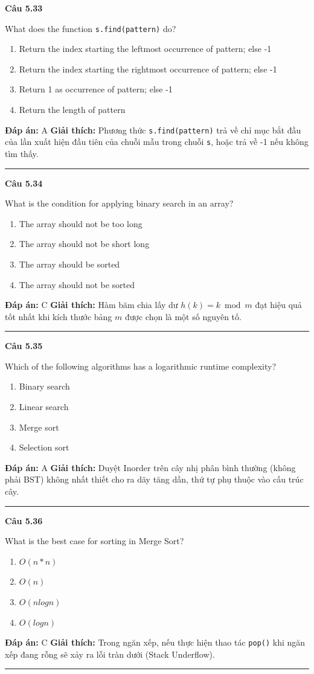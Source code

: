\documentclass[11pt,a4paper]{article}
\newenvironment{question}[1]{%
  \par\vspace{1em}\noindent\textbf{\large Câu #1}\par\vspace{0.4em}
}{%
  \par\vspace{1em}\hrule\vspace{0.6em}
}
\newenvironment{choices}{%
  \begin{enumerate}[label=\textbf{\Alph*.},leftmargin=2.2em,itemsep=2pt,topsep=3pt]
}{%
  \end{enumerate}
}
\newcommand{\choice}{\item}
\begin{document}
\begin{question}{5.33}
What does the function \texttt{s.find(pattern)} do?
\begin{choices}
\choice Return the index starting the leftmost occurrence of pattern; else -1
\choice Return the index starting the rightmost occurrence of pattern; else -1
\choice Return 1 as occurrence of pattern; else -1
\choice Return the length of pattern
\end{choices}
\textbf{Đáp án:} A
\textbf{Giải thích:} Phương thức \texttt{s.find(pattern)} trả về chỉ mục bắt đầu của lần xuất hiện đầu tiên của chuỗi mẫu trong chuỗi \texttt{s}, hoặc trả về -1 nếu không tìm thấy.
\end{question}

\begin{question}{5.34}
What is the condition for applying binary search in an array?
\begin{choices}
\choice The array should not be too long
\choice The array should not be short long
\choice The array should be sorted
\choice The array should not be sorted
\end{choices}
\textbf{Đáp án:} C
\textbf{Giải thích:} Hàm băm chia lấy dư $h(k) = k \bmod m$ đạt hiệu quả tốt nhất khi kích thước bảng $m$ được chọn là một số nguyên tố.
\end{question}

\begin{question}{5.35}
Which of the following algorithms has a logarithmic runtime complexity?
\begin{choices}
\choice Binary search
\choice Linear search
\choice Merge sort
\choice Selection sort
\end{choices}
\textbf{Đáp án:} A
\textbf{Giải thích:} Duyệt Inorder trên cây nhị phân bình thường (không phải BST) không nhất thiết cho ra dãy tăng dần, thứ tự phụ thuộc vào cấu trúc cây.
\end{question}

\begin{question}{5.36}
What is the best case for sorting in Merge Sort?
\begin{choices}
\choice $O(n * n)$
\choice $O(n)$
\choice $O(nlogn)$
\choice $O(logn)$
\end{choices}
\textbf{Đáp án:} C
\textbf{Giải thích:} Trong ngăn xếp, nếu thực hiện thao tác \texttt{pop()} khi ngăn xếp đang rỗng sẽ xảy ra lỗi tràn dưới (Stack Underflow).
\end{question}
\end{document}
